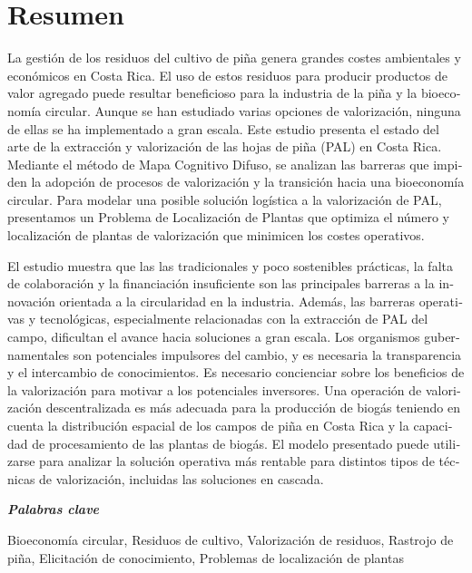 \chapter*{Resumen}

\begin{otherlanguage}{spanish}


\noindent La gestión de los residuos del cultivo de piña genera grandes costes ambientales y económicos en Costa Rica. El uso de estos residuos para producir productos de valor agregado puede resultar beneficioso para la industria de la piña y la bioeconomía circular. Aunque se han estudiado varias opciones de valorización, ninguna de ellas se ha implementado a gran escala. Este estudio presenta el estado del arte de la extracción y valorización de las hojas de piña (PAL) en Costa Rica. Mediante el método de Mapa Cognitivo Difuso, se analizan las barreras que impiden la adopción de procesos de valorización y la transición hacia una bioeconomía circular. Para modelar una posible solución logística a la valorización de PAL, presentamos un Problema de Localización de Plantas que optimiza el número y localización de plantas de valorización que minimicen los costes operativos. 

\noindent  El estudio muestra que las las tradicionales y poco sostenibles prácticas, la falta de colaboración y la financiación insuficiente son las principales barreras a la innovación orientada a la circularidad en la industria. Además, las barreras operativas y tecnológicas, especialmente relacionadas con la extracción de PAL del campo, dificultan el avance hacia soluciones a gran escala. Los organismos gubernamentales son potenciales impulsores del cambio, y es necesaria la transparencia y el intercambio de conocimientos. Es necesario concienciar sobre los beneficios de la valorización para motivar a los potenciales inversores. Una operación de valorización descentralizada es más adecuada para la producción de biogás teniendo en cuenta
la distribución espacial de los campos de piña en Costa Rica y la capacidad de procesamiento de las plantas de biogás. El modelo presentado puede utilizarse para analizar la solución operativa más rentable para distintos tipos de técnicas de valorización, incluidas las soluciones en cascada. 


\vspace{1cm}

\noindent \textit{\textbf{Palabras clave}}

\noindent Bioeconomía circular, Residuos de cultivo, Valorización de residuos, Rastrojo de piña, Elicitación de conocimiento, Problemas de localización de plantas

\end{otherlanguage}
